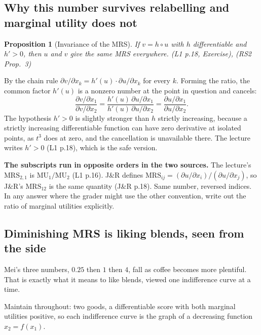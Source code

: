 \documentclass[11pt,letterpaper]{article}
\theoremstyle{definition}
\theoremstyle{plain}
\newtheorem{prop}{Proposition}
\newcommand{\src}[1]{{\small\textsf{(#1)}}}
\newcommand{\MRS}{\mathrm{MRS}}
\newcommand{\MU}{\mathrm{MU}}
\newcommand{\skipnote}{\noindent{\small\textsf{Proof. Skippable on a first read.}}\par\smallskip}
\begin{document}
\subsection{Why this number survives relabelling and marginal utility does not}

\begin{prop}[Invariance of the MRS] If $v = h \circ u$ with $h$ differentiable and $h' > 0$, then
$u$ and $v$ give the same MRS everywhere. \src{L1 p.18, Exercise}, \src{RS2 Prop.\ 3}
\end{prop}

\skipnote
\begin{leftbar}
\small
By the chain rule $\partial v / \partial x_k = h'(u) \cdot \partial u / \partial x_k$ for every $k$.
Forming the ratio, the common factor $h'(u)$ is a nonzero number at the point in question and
cancels:
\[
\frac{\partial v / \partial x_1}{\partial v / \partial x_2}
= \frac{h'(u)\,\partial u / \partial x_1}{h'(u)\,\partial u / \partial x_2}
= \frac{\partial u / \partial x_1}{\partial u / \partial x_2} .
\]
The hypothesis $h' > 0$ is slightly stronger than $h$ strictly increasing, because a strictly
increasing differentiable function can have zero derivative at isolated points, as $t^3$ does at
zero, and the cancellation is unavailable there. The lecture writes $h' > 0$ \src{L1 p.18}, which is
the safe version.
\end{leftbar}

\begin{snugshade}
\noindent\textbf{The subscripts run in opposite orders in the two sources.} The lecture's
$\MRS_{2,1}$ is $\MU_1/\MU_2$ \src{L1 p.16}. J\&R defines $\MRS_{ij} = (\partial u/\partial x_i) /
(\partial u/\partial x_j)$, so J\&R's $\MRS_{12}$ is the same quantity \src{J\&R p.18}. Same number,
reversed indices. In any answer where the grader might use the other convention, write out the ratio
of marginal utilities explicitly.
\end{snugshade}

\subsection{Diminishing MRS is liking blends, seen from the side}

Mei's three numbers, $0.25$ then $1$ then $4$, fall as coffee becomes more plentiful. That is exactly
what it means to like blends, viewed one indifference curve at a time.

Maintain throughout: two goods, a differentiable score with both marginal utilities positive, so each
indifference curve is the graph of a decreasing function $x_2 = f(x_1)$.
\end{document}
